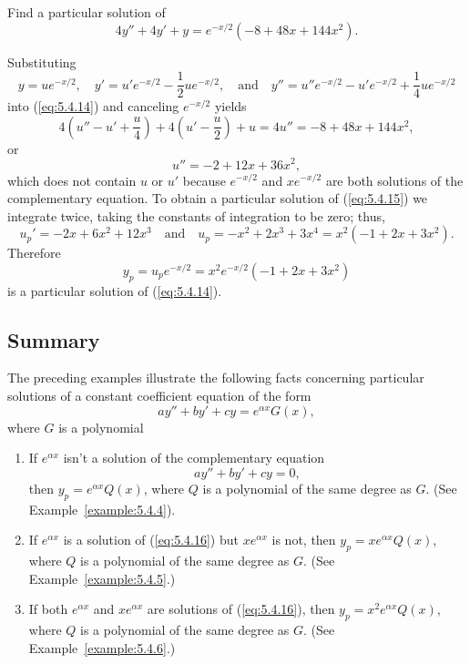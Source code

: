 \documentclass{ximera}
\begin{document}
\begin{example}\label{example:5.4.6}
Find a particular solution of
\begin{equation} \label{eq:5.4.14}
4y''+4y'+y=e^{-x/2}(-8+48x+144x^2).
\end{equation}


\begin{explanation}  Substituting
$$
y=ue^{-x/2},\quad  y'=u'e^{-x/2}-\frac{1}{2}ue^{-x/2},\quad\mbox{and}\quad y''=u''e^{-x/2}-u'e^{-x/2}+\frac{1}{4}ue^{-x/2}
$$
into (\ref{eq:5.4.14}) and  canceling $e^{-x/2}$  yields
$$
4\left(u''-u'+\frac{u}{4}\right)+4\left(u'-\frac{u}{2}\right)+u=4u''=-8+48x+144x^2,
$$
or
\begin{equation} \label{eq:5.4.15}
u''=-2+12x+36x^2,
\end{equation}
which does not contain $u$ or $u'$ because $e^{-x/2}$ and $xe^{-x/2}$
are both solutions of the complementary equation. 
To obtain a particular solution of
(\ref{eq:5.4.15}) we integrate twice, taking the constants of integration
to be zero;   thus,
$$
u_p'=-2x+6x^2+12x^3\quad\mbox{and}\quad
u_p=-x^2+2x^3+3x^4=x^2(-1+2x+3x^2).
$$
Therefore
$$
y_p=u_pe^{-x/2}=x^2e^{-x/2}(-1+2x+3x^2)
$$
is a particular solution of  (\ref{eq:5.4.14}).
\end{explanation}
\end{example}

\subsection*{Summary}

The preceding examples illustrate the following facts concerning
 particular solutions of a constant coefficient equation of the form
$$
ay''+by'+cy=e^{\alpha x}G(x),
$$
where $G$ is a polynomial 
\begin{enumerate}
\item\label{item:partsolutionfactsa} %
If $e^{\alpha x}$ isn't  a solution of the complementary
equation
\begin{equation} \label{eq:5.4.16}
ay''+by'+cy=0,
\end{equation}
then  $y_p=e^{\alpha x}Q(x)$,
 where $Q$ is a polynomial of the same degree as $G$.
(See Example~\ref{example:5.4.4}).
\item\label{item:partsolutionfactsb} %
If $e^{\alpha x}$ is a solution of (\ref{eq:5.4.16}) but $xe^{\alpha x}$
is not, then  $y_p=xe^{\alpha x}Q(x)$,
 where $Q$ is a polynomial of the same degree as $G$.
(See Example~\ref{example:5.4.5}.)
\item\label{item:partsolutionfactsc} %
If both $e^{\alpha x}$ and $xe^{\alpha x}$ are solutions of (\ref{eq:5.4.16}),
then  $y_p=x^2e^{\alpha x}Q(x)$,
 where $Q$ is a polynomial of the same degree as $G$.
(See Example~\ref{example:5.4.6}.)
\end{enumerate}
\end{document}
